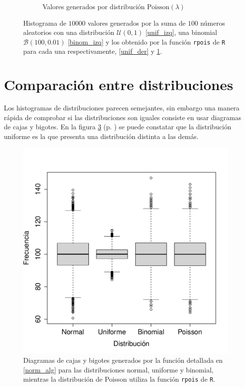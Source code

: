 \documentclass[paper=leter, fontsize=11pt]{scrartcl}
\numberwithin{equation}{section}		%
\numberwithin{figure}{section}			%
\numberwithin{table}{section}				%
\begin{document}
\begin{figure}
\begin{subfigure}{0.5\textwidth}
        \caption{Valores generados por distribución $\text{Poisson}(\lambda)$}
        \label{binom_der}
    \end{subfigure}
    \caption{Histograma de $10000$ valores generados por la suma de $100$ números aleatorios con una distribución $\mathcal{U}(0, 1)$ \ref{unif_izq}, una binomial $\mathcal{B}(100, 0.01)$ \ref{binom_izq} y los obtenido por la función \texttt{rpois} de \texttt{R}  para cada una respectivamente, \ref{unif_der} y \ref{binom_der}.}
    \label{unif}
\end{figure}

\section{Comparación entre distribuciones}

Los histogramas de distribuciones parecen semejantes, sin embargo una manera rápida de comprobar si las distribuciones son iguales consiste en usar diagramas de cajas y bigotes. En la figura \ref{boxplots} (p. \pageref{boxplots}) se puede constatar que la distribución uniforme es la que presenta una distribución distinta a las demás.

\begin{figure}
    \centering
    \includegraphics[width=1\textwidth]{boxplots.pdf}
    \caption{Diagramas de cajas y bigotes generados por la función detallada en \ref{norm_alg} para las distribuciones normal, uniforme y binomial, mientras la distribución de Poisson utiliza la función \texttt{rpois} de \texttt{R}.}
    \label{boxplots}
\end{figure}



\end{document}
